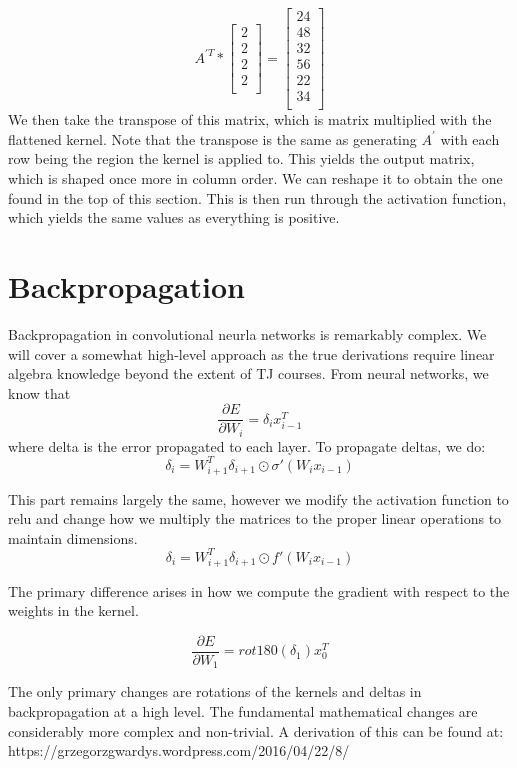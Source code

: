 \documentclass{exam}
\begin{document}
\[
A^{'T} *  
\begin{bmatrix}
    2\\
    2\\
    2\\
    2\\
\end{bmatrix}
= 
\begin{bmatrix}
    24\\
    48\\
    32\\
    56\\
    22\\
    34\\
\end{bmatrix}
\]
We then take the transpose of this matrix, which is matrix multiplied with the flattened kernel. Note that the transpose is the same as generating $A^{'}$ with each row being the region the kernel is applied to. This yields the output matrix, which is shaped once more in column order. We can reshape it to obtain the one found in the top of this section. This is then run through the activation function, which yields the same values as everything is positive.

\section{Backpropagation}
Backpropagation in convolutional neurla networks is remarkably complex. We will cover a somewhat high-level approach as the true derivations require linear algebra knowledge beyond the extent of TJ courses. From neural networks, we know that 
\[\frac{\partial E}{\partial W_i} = \delta_i x_{i-1}^T\]
where delta is the error propagated to each layer. To propagate deltas, we do:
\[\delta_i = W_{i+1}^T\delta_{i+1} \odot \sigma'(W_ix_{i-1})\]

This part remains largely the same, however we modify the activation function to relu and change how we multiply the matrices to the proper linear operations to maintain dimensions.
\[\delta_i = W_{i+1}^T\delta_{i+1} \odot f'(W_ix_{i-1})\]

The primary difference arises in how we compute the gradient with respect to the weights in the kernel.

\[\frac{\partial E}{\partial W_1} = rot180(\delta_1) x_0^T\]

The only primary changes are rotations of the kernels and deltas in backpropagation at a high level. The fundamental mathematical changes are considerably more complex and non-trivial. A derivation of this can be found at: https://grzegorzgwardys.wordpress.com/2016/04/22/8/
\end{document}
